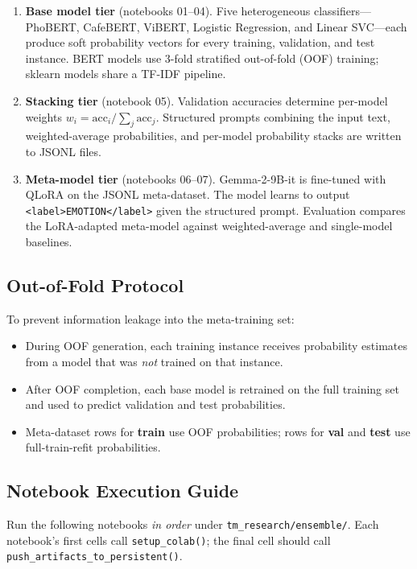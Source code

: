 \documentclass[11pt,a4paper]{article}
\newcommand{\repo}[1]{\texttt{#1}}
\begin{document}
\begin{enumerate}[label=\arabic*.]
  \item \textbf{Base model tier} (notebooks 01--04). Five heterogeneous classifiers---PhoBERT, CafeBERT, ViBERT, Logistic Regression, and Linear SVC---each produce soft probability vectors for every training, validation, and test instance. BERT models use 3-fold stratified out-of-fold (OOF) training; sklearn models share a TF-IDF pipeline.
  \item \textbf{Stacking tier} (notebook 05). Validation accuracies determine per-model weights $w_i = \mathrm{acc}_i / \sum_j \mathrm{acc}_j$. Structured prompts combining the input text, weighted-average probabilities, and per-model probability stacks are written to JSONL files.
  \item \textbf{Meta-model tier} (notebooks 06--07). Gemma-2-9B-it is fine-tuned with QLoRA on the JSONL meta-dataset. The model learns to output \texttt{<label>EMOTION</label>} given the structured prompt. Evaluation compares the LoRA-adapted meta-model against weighted-average and single-model baselines.
\end{enumerate}

\subsection{Out-of-Fold Protocol}
To prevent information leakage into the meta-training set:
\begin{itemize}[nosep]
  \item During OOF generation, each training instance receives probability estimates from a model that was \emph{not} trained on that instance.
  \item After OOF completion, each base model is retrained on the full training set and used to predict validation and test probabilities.
  \item Meta-dataset rows for \textbf{train} use OOF probabilities; rows for \textbf{val} and \textbf{test} use full-train-refit probabilities.
\end{itemize}

\subsection{Notebook Execution Guide}
Run the following notebooks \emph{in order} under \repo{tm\_research/ensemble/}. Each notebook's first cells call \repo{setup\_colab()}; the final cell should call \repo{push\_artifacts\_to\_persistent()}.
\end{document}

